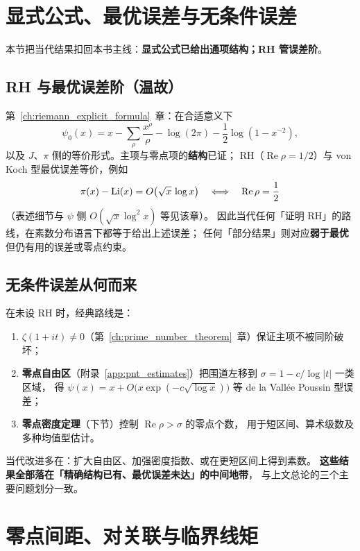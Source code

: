 \section{显式公式、最优误差与无条件误差}

本节把当代结果扣回本书主线：\textbf{显式公式已给出通项结构；RH 管误差阶}。

\subsection{RH 与最优误差阶（温故）}

第~\ref{ch:riemann_explicit_formula}~章：在合适意义下
\[
\psi_0(x)=x-\sum_{\rho}\frac{x^{\rho}}{\rho}-\log(2\pi)-\frac12\log(1-x^{-2}),
\]
以及 $J$、$\pi$ 侧的等价形式。主项与零点项的\textbf{结构}已证；
RH（$\operatorname{Re}\rho=1/2$）与 von Koch 型最优误差等价，例如
\[
\pi(x)-\operatorname{Li}(x)=O\bigl(\sqrt{x}\,\log x\bigr)
\quad\Longleftrightarrow\quad
\operatorname{Re}\rho=\frac12
\]
（表述细节与 $\psi$ 侧 $O(\sqrt{x}\log^2 x)$ 等见该章）。
因此当代任何「证明 RH」的路线，在素数分布语言下都等于给出上述误差；
任何「部分结果」则对应\textbf{弱于最优}但仍有用的误差或零点约束。

\subsection{无条件误差从何而来}

在未设 RH 时，经典路线是：
\begin{enumerate}
  \item $\zeta(1+it)\neq 0$（第~\ref{ch:prime_number_theorem}~章）保证主项不被同阶破坏；
  \item \textbf{零点自由区}（附录~\ref{app:pnt_estimates}）把围道左移到 $\sigma=1-c/\log|t|$ 一类区域，
        得 $\psi(x)=x+O\bigl(x\exp(-c\sqrt{\log x})\bigr)$ 等 de la Vallée Poussin 型误差；
  \item \textbf{零点密度定理}（下节）控制 $\operatorname{Re}\rho>\sigma$ 的零点个数，
        用于短区间、算术级数及多种均值型估计。
\end{enumerate}
当代改进多在：扩大自由区、加强密度指数、或在更短区间上得到素数。
\textbf{这些结果全部落在「精确结构已有、最优误差未达」的中间地带}，
与上文总论的三个主要问题划分一致。

\section{零点间距、对关联与临界线矩}

